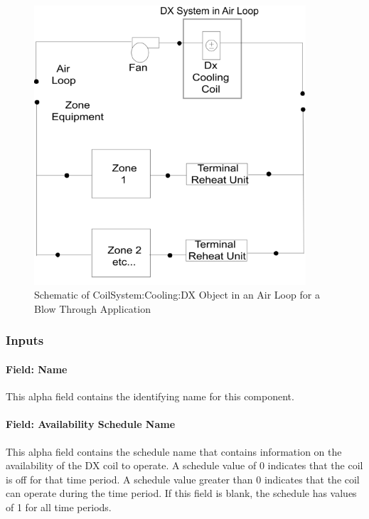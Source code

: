 \begin{figure}[hbtp] %
\centering
\includegraphics[width=0.9\textwidth, height=0.9\textheight, keepaspectratio=true]{media/image368.png}
\caption{Schematic of CoilSystem:Cooling:DX Object in an Air Loop for a Blow Through Application \protect \label{fig:schematic-of-coilsystem-cooling-dx-object-in}}
\end{figure}

\subsubsection{Inputs}\label{inputs-23-000}

\paragraph{Field: Name}\label{field-name-22-000}

This alpha field contains the identifying name for this component.

\paragraph{Field: Availability Schedule Name}\label{field-availability-schedule-name-13-000}

This alpha field contains the schedule name that contains information on the availability of the DX coil to operate. A schedule value of 0 indicates that the coil is off for that time period. A schedule value greater than 0 indicates that the coil can operate during the time period. If this field is blank, the schedule has values of 1 for all time periods.

